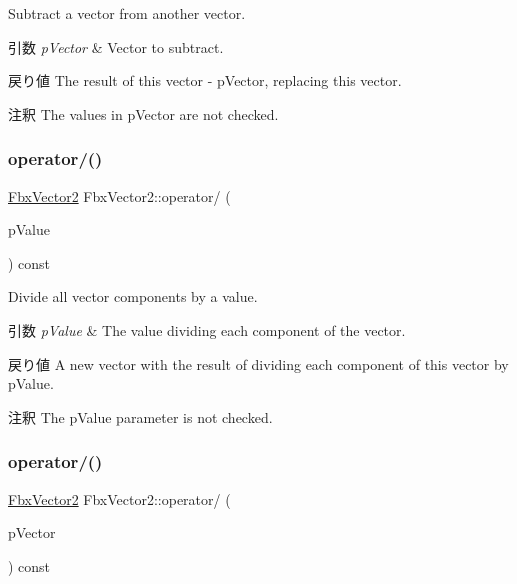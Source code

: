 Subtract a vector from another vector. 
\begin{DoxyParams}{引数}
{\em p\+Vector} & Vector to subtract. \\
\hline
\end{DoxyParams}
\begin{DoxyReturn}{戻り値}
The result of this vector -\/ p\+Vector, replacing this vector. 
\end{DoxyReturn}
\begin{DoxyRemark}{注釈}
The values in p\+Vector are not checked. 
\end{DoxyRemark}
\mbox{\label{class_fbx_vector2_a4ce28019385c003ced7bc9c3278ab41a}} 
\subsubsection{\texorpdfstring{operator/()}{operator/()}\hspace{0.1cm}{\footnotesize\ttfamily [1/2]}}
{\footnotesize\ttfamily \hyperlink{class_fbx_vector2}{Fbx\+Vector2} Fbx\+Vector2\+::operator/ (\begin{DoxyParamCaption}\item[{double}]{p\+Value }\end{DoxyParamCaption}) const}

Divide all vector components by a value. 
\begin{DoxyParams}{引数}
{\em p\+Value} & The value dividing each component of the vector. \\
\hline
\end{DoxyParams}
\begin{DoxyReturn}{戻り値}
A new vector with the result of dividing each component of this vector by p\+Value. 
\end{DoxyReturn}
\begin{DoxyRemark}{注釈}
The p\+Value parameter is not checked. 
\end{DoxyRemark}
\mbox{\label{class_fbx_vector2_a8a5b9035fefe1229eedeb323c1473320}} 
\subsubsection{\texorpdfstring{operator/()}{operator/()}\hspace{0.1cm}{\footnotesize\ttfamily [2/2]}}
{\footnotesize\ttfamily \hyperlink{class_fbx_vector2}{Fbx\+Vector2} Fbx\+Vector2\+::operator/ (\begin{DoxyParamCaption}\item[{const \hyperlink{class_fbx_vector2}{Fbx\+Vector2} \&}]{p\+Vector }\end{DoxyParamCaption}) const}

